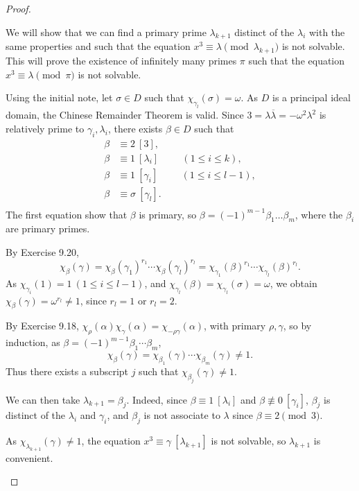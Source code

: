 \documentclass[11pt,a4paper]{article}
\begin{document}
\begin{proof}
\begin{enumerate}
We will show that we can find a primary prime $\lambda_{k+1}$ distinct of the $\lambda_i$ with the same properties and such that the equation $x^3 \equiv \lambda \pmod {\lambda_{k+1}}$ is not solvable. This will prove the existence of infinitely many primes $\pi$ such that the equation $x^3 \equiv \lambda \pmod \pi$ is not solvable.

Using the initial note, let $\sigma \in D$ such that $\chi_{\gamma_l}(\sigma) = \omega$. As $D$ is a principal ideal domain, the Chinese Remainder Theorem is valid. Since $3 = \lambda \overline{\lambda} = -\omega^2 \lambda^2$ is relatively prime to $\gamma_i, \lambda_i$, there exists $\beta \in D$ such that
\begin{align*}
\beta &\equiv 2 \ [3],\\
\beta &\equiv 1 \ [\lambda_i] \hspace{1cm} (1\leq i\leq k),\\
\beta &\equiv 1 \ [\gamma_i] \hspace{1cm} (1 \leq i \leq l-1),\\
\beta &\equiv  \sigma \ [\gamma_l].\\
\end{align*}
The first equation show that $\beta$ is primary, so $\beta= (-1)^{m-1} \beta_1\ldots \beta_m$, where the $\beta_i$ are primary primes.

By Exercise 9.20,
$$\chi_\beta(\gamma) = \chi_\beta(\gamma_1)^{r_1}\cdots\chi_\beta(\gamma_l)^{r_l} = \chi_{\gamma_1}(\beta)^{r_1}\cdots\chi_{\gamma_l}(\beta)^{r_l}.$$
As $\chi_{\gamma_i}(1) = 1 \ (1\leq i \leq l-1)$, and $\chi_{\gamma_l}(\beta) = \chi_{\gamma_l}(\sigma) =\omega$, we obtain $\chi_\beta(\gamma) = \omega^{r_l} \neq 1$, since $r_l =1$ or $r_l = 2$.

By Exercise 9.18, $\chi_\rho(\alpha) \chi_\gamma(\alpha) = \chi_{-\rho \gamma}(\alpha)$, with primary $\rho, \gamma$, so by induction, as $\beta= (-1)^{m-1} \beta_1\cdots\beta_m$,
$$\chi_\beta(\gamma) = \chi_{\beta_1}(\gamma)\cdots\chi_{\beta_m}(\gamma) \neq 1.$$
Thus there exists a subscript $j$ such that $\chi_{\beta_j}(\gamma) \neq 1$.

We can then take $\lambda_{k+1} = \beta_j$. Indeed, since $\beta \equiv 1 \ [\lambda_i]$ and $\beta \not \equiv 0\ [\gamma_i]$, $\beta_j$ is distinct of the $\lambda_i$ and $\gamma_i$, and $\beta_j$ is not associate to $\lambda$ since $\beta \equiv 2 \pmod 3$.

As $\chi_{\lambda_{k+1}}(\gamma) \neq 1$, the equation $x^3 \equiv \gamma \ [\lambda _{k+1}]$ is not solvable, so $\lambda_{k+1}$ is convenient. 


\end{enumerate}
\end{proof}
\end{document}
